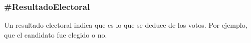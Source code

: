 \subsubsection{\#ResultadoElectoral}

Un resultado electoral indica que es lo que se deduce de los
votos. Por ejemplo, que el candidato fue elegido o no.

\begin{description}
  
\end{description}

